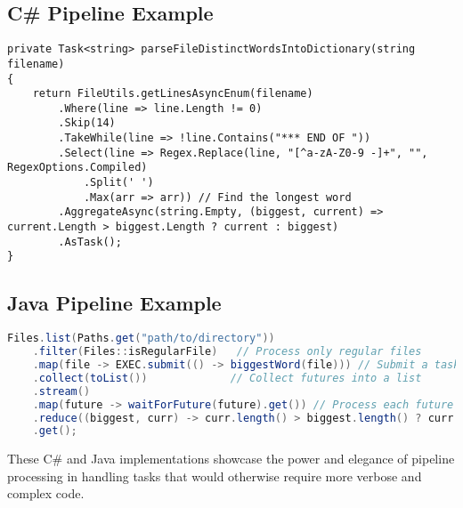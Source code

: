 \clearpage

\lstset{basicstyle=\footnotesize\ttfamily} %

\subsection*{C\# Pipeline Example}

\begin{lstlisting}[language={[Sharp]C}, caption={C\# Pipeline for Parsing Distinct Words into a Dictionary}]
private Task<string> parseFileDistinctWordsIntoDictionary(string filename)
{
    return FileUtils.getLinesAsyncEnum(filename)
        .Where(line => line.Length != 0)   
        .Skip(14)                          
        .TakeWhile(line => !line.Contains("*** END OF ")) 
        .Select(line => Regex.Replace(line, "[^a-zA-Z0-9 -]+", "", RegexOptions.Compiled)
            .Split(' ')
            .Max(arr => arr)) // Find the longest word
        .AggregateAsync(string.Empty, (biggest, current) => current.Length > biggest.Length ? current : biggest) 
        .AsTask();
}
\end{lstlisting}

\subsection*{Java Pipeline Example}
\begin{lstlisting}[language=Java, caption={Java Pipeline for Finding the Largest Word in Files}]
Files.list(Paths.get("path/to/directory"))
    .filter(Files::isRegularFile)   // Process only regular files
    .map(file -> EXEC.submit(() -> biggestWord(file))) // Submit a task for each file
    .collect(toList())             // Collect futures into a list
    .stream()
    .map(future -> waitForFuture(future).get()) // Process each future
    .reduce((biggest, curr) -> curr.length() > biggest.length() ? curr : biggest) // Reduce to find the largest word
    .get();
\end{lstlisting}

\lstset{basicstyle=\normalsize\ttfamily} %

These C\# and Java implementations showcase the power and elegance of pipeline processing in handling tasks that would otherwise require more verbose and complex code.
